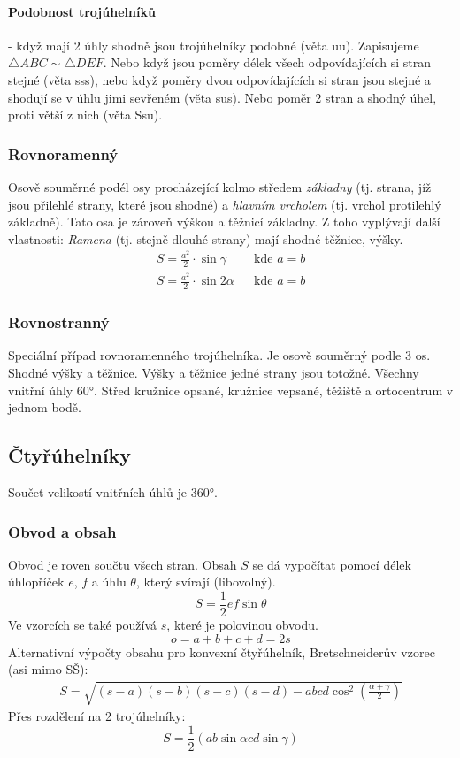 \documentclass[12pt]{article}
\begin{document}
\paragraph{Podobnost trojúhelníků} - když mají 2 úhly shodně jsou trojúhelníky podobné (věta uu). Zapisujeme $\bigtriangleup ABC \sim \bigtriangleup DEF$. Nebo když jsou poměry délek všech odpovídajících si stran stejné (věta sss), nebo když poměry dvou odpovídajících si stran jsou stejné a shodují se v úhlu jimi sevřeném (věta sus). Nebo poměr 2 stran a shodný úhel, proti větší z nich (věta Ssu).
\subsubsection{Rovnoramenný}
Osově souměrné podél osy procházející kolmo středem \emph{základny} (tj. strana, jíž jsou přilehlé strany, které jsou shodné) a \emph{hlavním vrcholem} (tj. vrchol protilehlý základně). Tato osa je zároveň výškou a těžnicí základny. Z toho vyplývají další vlastnosti: \emph{Ramena} (tj. stejně dlouhé strany) mají shodné těžnice, výšky.
\begin{align}
S = \frac{a^2}{2} \cdot \sin \gamma && \text{kde } a=b\\
S = \frac{a^2}{2} \cdot \sin 2\alpha && \text{kde } a=b
\end{align}
\subsubsection{Rovnostranný}
Speciální případ rovnoramenného trojúhelníka. Je osově souměrný podle 3 os. Shodné výšky a těžnice. Výšky a těžnice jedné strany jsou totožné. Všechny vnitřní úhly 60°. Střed kružnice opsané, kružnice vepsané,  těžiště a ortocentrum v jednom bodě.


\subsection{Čtyřúhelníky}
Součet velikostí vnitřních úhlů je 360°.
\subsubsection{Obvod a obsah}
Obvod je roven součtu všech stran. Obsah $S$ se dá vypočítat pomocí délek úhlopříček $e$, $f$ a úhlu $\theta$, který svírají (libovolný).
\begin{equation}
S = \frac{1}{2} ef\sin \theta
\end{equation}
Ve vzorcích se také používá $s$, které je polovinou obvodu.
\begin{equation}
o =a+b+c+d = 2s
\end{equation}
Alternativní výpočty obsahu pro konvexní čtyřúhelník, Bretschneiderův vzorec (asi mimo SŠ):
\begin{align}
S = \sqrt{(s-a)(s-b)(s-c)(s-d) - abcd \cos^2\left( \frac{\alpha + \gamma}{2} \right)}
\end{align}
Přes rozdělení na 2 trojúhelníky:
\begin{equation}
S = \frac{1}{2} \left( ab\sin\alpha cd\sin\gamma \right)
\end{equation}
\end{document}
